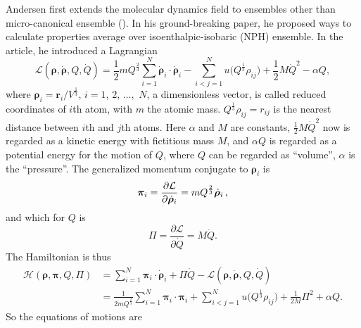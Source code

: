 Andersen first extends the molecular dynamics field to
ensembles other than micro-canonical ensemble (\cite{Andersen:1980ew}).
In his ground-breaking paper, he proposed ways to calculate properties average
over isoenthalpic-isobaric (NPH) ensemble. In the article, he introduced
a Lagrangian
\begin{equation}\label{eq:andersenlagrang}
	\mathcal{L}(\bm{\rho}, \dot{\bm{\rho}}, Q, \dot{ Q }) = \frac{ 1 }{ 2 } m
	Q^{\frac{ 2 }{ 3 }}
	\sum_{i=1}^{N} \dot{ \bm{\rho} }_i \cdot \dot{ \bm{\rho} }_i - \sum_{i<j=1}^{N}
	u \big(Q^{\frac{ 1 }{ 3 }} \rho_{ij} \big) + \frac{ 1 }{ 2 } M \dot{ Q } ^2 -
	\alpha Q,
\end{equation}
where $\bm{\rho}_i = \bm{r}_i / V ^{\frac{ 1 }{ 3 }}$, $i=1$, $2$, $\ldots$,~$N$,
a dimensionless vector,
is called reduced coordinates of $i$th atom, with $m$ the atomic mass.
$Q^{\frac{ 1 }{ 3 }}\rho_{ij} = r_{ij}$ is the nearest distance between
$i$th and $j$th atoms.
Here $\alpha$ and $M$ are constants,
$\frac{ 1 }{ 2 } M \dot{ Q }^2$ now is regarded as a kinetic energy with fictitious
mass $M$,
and $\alpha Q$ is regarded as a potential energy for the motion of $Q$,
where $Q$ can be regarded as ``volume'', $\alpha$ is the ``pressure''.
The generalized momentum conjugate to $\bm{\rho}_i$ is
\begin{equation}
	\bm{\pi}_i = \frac{ \partial \mathcal{L} }{ \partial \dot{ \bm{\rho} }_i } =
	m Q^{\frac{ 2 }{ 3 }} \dot{\bm{\rho}}_i \thinspace,
\end{equation}
and which for $Q$ is
\begin{equation}
	\Pi = \frac{ \partial \mathcal{L} }{ \partial \dot{Q} } = M \dot{ Q }.
\end{equation}
The Hamiltonian is thus
\begin{equation}
	\begin{split}
		\mathcal{H}(\bm{\rho}, \bm{\pi}, Q, \Pi) &= \sum_{i=1}^{N} \bm{\pi}_i \cdot
		\dot{ \bm{\rho} }_i + \Pi \dot{ Q } - \mathcal{L}
		(\bm{\rho}, \dot{\bm{\rho}}, Q, \dot{ Q })\\
		&= \frac{ 1 }{ 2 m Q^{\frac{ 2 }{ 3 }} }
		\sum_{i=1}^{N} \bm{\pi}_i \cdot \bm{\pi}_i
		+ \sum_{i<j=1}^{N} u\big(Q^{\frac{ 1 }{ 3 }} \rho_{ij}\big) + \frac{ 1 }{ 2 M }
		\Pi^2 + \alpha Q.
	\end{split}
\end{equation}
So the equations of motions are
